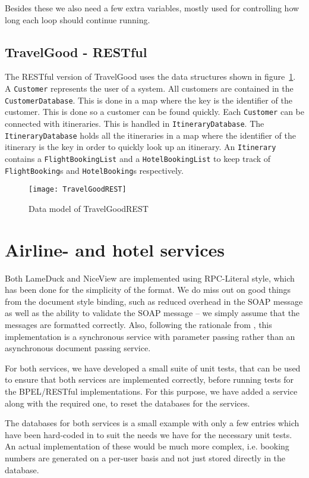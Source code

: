 Besides these we also need a few extra variables, mostly used for controlling how long each loop should continue running.

\subsection{TravelGood - RESTful}
The RESTful version of TravelGood uses the data structures shown in figure~\ref{fig:rest_class}. A \texttt{Customer} represents the user of a system. All customers are contained in the \texttt{CustomerDatabase}. This is done in a map where the key is the identifier of the customer. This is done so a customer can be found quickly. Each \texttt{Customer} can be connected with itineraries. This is handled in \texttt{ItineraryDatabase}. The \texttt{ItineraryDatabase} holds all the itineraries in a map where the identifier of the itinerary is the key in order to quickly look up an itinerary. An \texttt{Itinerary} contains a \texttt{FlightBookingList} and a \texttt{HotelBookingList} to keep track of \texttt{FlightBooking}s and \texttt{HotelBooking}s respectively.

\begin{figure}[H]
\centering
\texttt{[image: TravelGoodREST]}
\caption{Data model of TravelGoodREST}
\label{fig:rest_class}
\end{figure}


\section{Airline- and hotel services}
Both LameDuck and NiceView are implemented using RPC-Literal style, which has been done for the simplicity of the format. We do miss out on good things from the document style binding, such as reduced overhead in the SOAP message as well as the ability to validate the SOAP message -- we simply assume that the messages are formatted correctly. 
Also, following the rationale from \cite{papazoglou2008web}, this implementation is a synchronous service with parameter passing rather than an asynchronous document passing service.

For both services, we have developed a small suite of unit tests, that can be used to ensure that both services are implemented correctly, before running tests for the BPEL/RESTful implementations. For this purpose, we have added a service along with the required one, to reset the databases for the services.\medskip

The databases for both services is a small example with only a few entries which have been hard-coded in to suit the needs we have for the necessary unit tests. An actual implementation of these would be much more complex, i.e. booking numbers are generated on a per-user basis and not just stored directly in the database.

